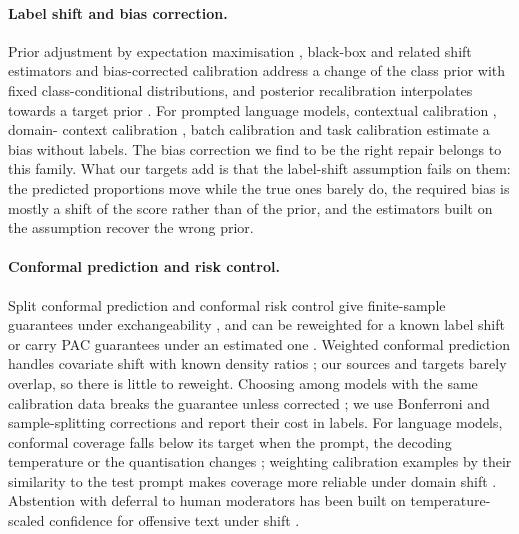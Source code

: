 \paragraph{Label shift and bias correction.}
Prior adjustment by expectation maximisation \citep{saerens2002adjusting}, black-box and related shift estimators
\citep{lipton2018bbse, garg2020unified} and bias-corrected calibration \citep{alexandari2020maximum} address a change of
the class prior with fixed class-conditional distributions, and posterior recalibration interpolates towards a target
prior \citep{tian2020posterior}. For prompted language models, contextual calibration \citep{zhao2021calibrate}, domain-
context calibration \citep{fei2023mitigating}, batch calibration \citep{zhou2024batch} and task calibration
\citep{li2025task} estimate a bias without labels. The bias correction we find to be the right repair belongs to this family. What our targets add
is that the label-shift assumption fails on them: the predicted proportions move while the true ones barely do, the
required bias is mostly a shift of the score rather than of the prior, and the estimators built on the assumption
recover the wrong prior.

\paragraph{Conformal prediction and risk control.}
Split conformal prediction and conformal risk control give finite-sample guarantees under exchangeability
\citep{angelopoulos2024crc}, and can be reweighted for a known label shift \citep{podkopaev2021distribution} or carry
PAC guarantees under an estimated one \citep{si2024pac}. Weighted conformal prediction handles covariate shift with
known density ratios \citep{tibshirani2019weighted}; our sources and targets barely overlap, so there is little to
reweight. Choosing among models with the same calibration data breaks the guarantee unless corrected
\citep{liang2024conformal}; we use Bonferroni and sample-splitting corrections and report their cost in labels. For
language models, conformal coverage falls below its target when the prompt, the decoding temperature or the
quantisation changes \citep{zhu2026conformalized}; weighting calibration examples by their similarity to the test
prompt makes coverage more reliable under domain shift \citep{lin2026domainshift}. Abstention with deferral to human moderators has been built on
temperature-scaled confidence for offensive text under shift \citep{islam2026shiftaware}.

